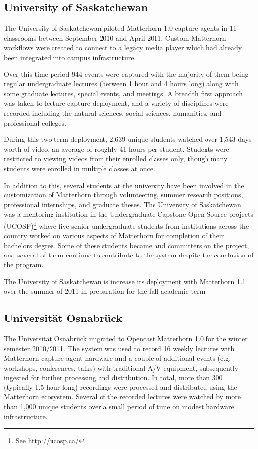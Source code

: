 \documentclass[letterpaper]{sig-alternate}
\begin{document}
\subsection{University of Saskatchewan}
The University of Saskatchewan piloted Matterhorn 1.0 capture agents in 11 classrooms between September 2010 and April 2011.  Custom Matterhorn workflows were created to connect to a legacy media player which had already been integrated into campus infrastructure.

Over this time period 944 events were captured with the majority of them being regular undergraduate lectures (between 1 hour and 4 hours long) along with some graduate lectures, special events, and meetings.  A breadth first approach was taken to lecture capture deployment, and a variety of disciplines were recorded including the natural sciences, social sciences, humanities, and professional colleges.

During this two term deployment, 2,639 unique students watched over 1,543 days worth of video, an average of roughly 41 hours per student.  Students were restricted to viewing videos from their enrolled classes only, though many students were enrolled in multiple classes at once.

In addition to this, several students at the university have been involved in the customization of Matterhorn through volunteering, summer research positions, professional internships, and graduate theses.  The University of Saskatchewan was a mentoring institution in the Undergraduate Capstone Open Source projects (UCOSP)\footnote{See http://ucosp.ca/} where five senior undergraduate students from institutions across the country worked on various aspects of Matterhorn for completion of their bachelors degree.  Some of these students became and committers on the project, and several of them continue to contribute to the system despite the conclusion of the program.

The University of Saskatchewan is increase its deployment with Matterhorn 1.1 over the summer of 2011 in preparation for the fall academic term.

\subsection{Universit\"{a}t Osnabr\"{u}ck}
The Universit\"{a}t Osnabr\"{u}ck migrated to Opencast Matterhorn 1.0 for the winter semester 2010/2011. The system was used to record 16 weekly lectures with Matterhorn capture agent hardware and a couple of additional events (e.g. workshops, conferences, talks) with traditional A/V equipment, subsequently ingested for further processing and distribution. In total, more than 300 (typically 1.5 hour long) recordings were processed and distributed using the Matterhorn ecosystem. Several of the recorded lectures were watched by more than 1,000 unique students over a small period of time on modest hardware infrastructure.
\end{document}
